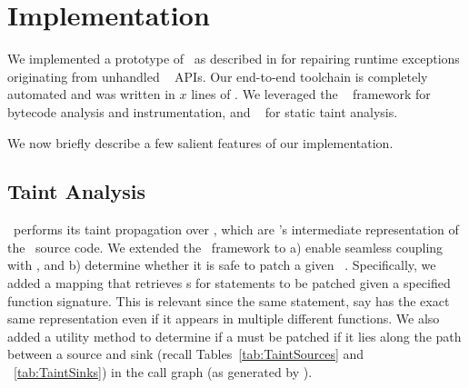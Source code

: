 \section{Implementation}
\label{sec:implementation}

We implemented a prototype of \tool\ as described in  for
repairing runtime exceptions originating from unhandled \java\ 
APIs. Our end-to-end toolchain is completely automated and was written in $x$
lines of \java. We leveraged the \soot~\cite{} framework for bytecode analysis
and instrumentation, and \infoflow~\cite{} for static taint analysis.


We now briefly describe a few salient features of our implementation.

\subsection{Taint Analysis}

\infoflow\ performs its taint propagation over , which are \soot's
intermediate representation of the \java\ source code. We extended the
\infoflow\ framework to a) enable seamless coupling with \soot, and b) determine
whether it is safe to patch a given \soot\ . Specifically, we added
a mapping that retrieves s for statements to be patched given a
specified function signature. This is relevant since the same statement, say
 has the exact same representation even if it appears in
multiple different functions. We also added a utility method to determine if a
 must be patched if it lies along the path between a source and sink
(recall Tables~\ref{tab:TaintSources} and ~\ref{tab:TaintSinks}) in the call
graph (as generated by \soot).


